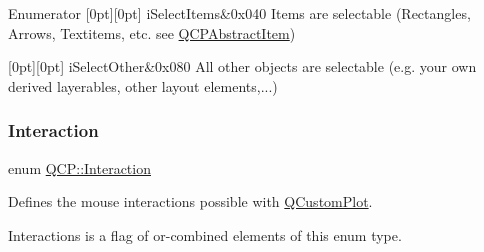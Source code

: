 \begin{DoxyEnumFields}{Enumerator}
[0pt][0pt]{}\mbox{\label{namespace_q_c_p_a2ad6bb6281c7c2d593d4277b44c2b037a271679ebb13ab4a6b4c2c2d9459f1de8}} 
i\+Select\+Items&{\ttfamily 0x040} Items are selectable (Rectangles, Arrows, Textitems, etc. see \hyperlink{class_q_c_p_abstract_item}{Q\+C\+P\+Abstract\+Item}) \\
\hline

[0pt][0pt]{}\mbox{\label{namespace_q_c_p_a2ad6bb6281c7c2d593d4277b44c2b037a2ba96f62595bc22603da0e575b589a83}} 
i\+Select\+Other&{\ttfamily 0x080} All other objects are selectable (e.\+g. your own derived layerables, other layout elements,...) \\
\hline

\end{DoxyEnumFields}
\mbox{\label{namespace_q_c_p_a2ad6bb6281c7c2d593d4277b44c2b037}} 
\subsubsection{\texorpdfstring{Interaction}{Interaction}\hspace{0.1cm}{\footnotesize\ttfamily [2/2]}}
{\footnotesize\ttfamily enum \hyperlink{namespace_q_c_p_a2ad6bb6281c7c2d593d4277b44c2b037}{Q\+C\+P\+::\+Interaction}}

Defines the mouse interactions possible with \hyperlink{class_q_custom_plot}{Q\+Custom\+Plot}.

{\ttfamily Interactions} is a flag of or-\/combined elements of this enum type.

